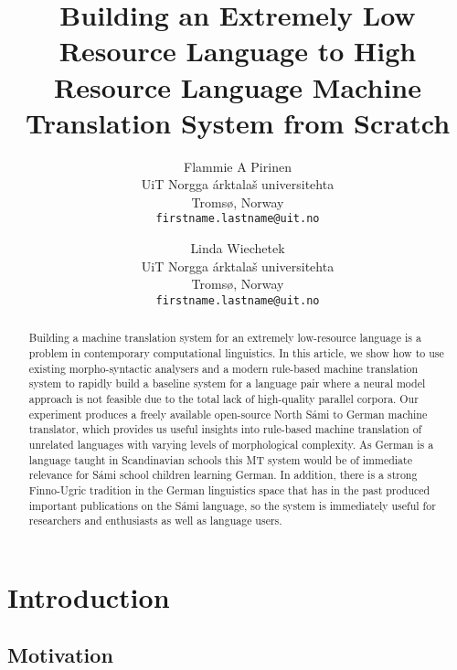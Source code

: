 \documentclass{flammie}
\title{Building an Extremely Low Resource Language to High Resource Language
Machine Translation System from Scratch}
\author{Flammie A Pirinen\\
UiT Norgga árktalaš universitehta\\
Tromsø, Norway\\
\texttt{firstname.lastname@uit.no} \and
Linda Wiechetek\\
UiT Norgga árktalaš universitehta\\
Tromsø, Norway\\
\texttt{firstname.lastname@uit.no}}
\date{}
\begin{document}
\maketitle
\begin{abstract}
    Building a machine translation system for an extremely low-resource language
    is a problem in contemporary computational linguistics.  In this article, we
    show how to use existing morpho-syntactic analysers and a modern rule-based
    machine translation system to rapidly build a baseline system for a language
    pair where a neural model approach is not feasible due to the total lack of
    high-quality parallel corpora.  Our experiment produces a freely available
    open-source North Sámi to German machine translator, which provides us
    useful insights into rule-based machine translation of unrelated languages
    with varying levels of morphological complexity. As German is a language
    taught in Scandinavian schools this MT system would be of immediate
    relevance for Sámi school children learning German. In addition, there is a
    strong Finno-Ugric tradition in the German linguistics space that has in the
    past produced important publications on the Sámi language, so the system is
    immediately useful for researchers and enthusiasts as well as language
    users.
\end{abstract}




\section{Introduction}

\subsection{Motivation}
\end{document}
